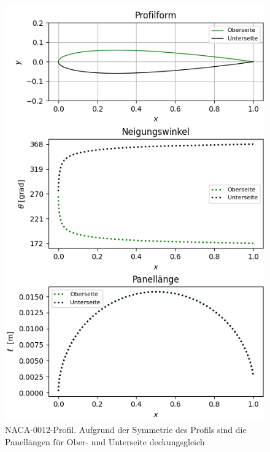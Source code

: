 \begin{figure}
\begin{center}
\includegraphics[scale=0.6]{figures/NACA0012.png} 
\caption{NACA-0012-Profil. Aufgrund der Symmetrie des Profils sind die Panellängen für Ober- und Unterseite deckungsgleich}
\label{fig:naca0012}
\end{center}
\end{figure}

\begin{table}
\label{tab:1}
\end{table}

